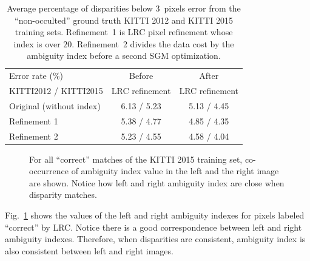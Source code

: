 \documentclass{article}
\begin{document}
\begin{table}
\centering
\begin{tabular}{|l|c|c|}
  \hline
  Error rate (\%) & Before & After \\
  KITTI2012 / KITTI2015      &  LRC refinement & LRC refinement \\
  \hline
  Original (without index) & 6.13 / 5.23 & 5.13 / 4.45 \\
  Refinement 1 & 5.38 / 4.77 & 4.85 / 4.35 \\
  Refinement 2 & 5.23 / 4.55 & 4.58 / 4.04 \\
  \hline
\end{tabular}
\caption{Average percentage of disparities below 3~pixels error from the ``non-occulted'' ground truth KITTI 2012 and KITTI 2015 training sets. Refinement~1 is LRC pixel refinement whose index is over $20$. Refinement~2 divides the data cost by the ambiguity index before a second SGM optimization.}
\label{tab:KITTI}
\end{table}

\begin{figure}[ht]
\begin{center}
\end{center}
\caption{For all ``correct'' matches of the KITTI 2015 training set, co-occurrence of ambiguity index value in the left and the right image are shown. Notice how left and right ambiguity index are close when disparity matches.}
\label{fig:LR_ind}
\end{figure}

Fig.~\ref{fig:LR_ind} shows the values of the left and right ambiguity indexes for pixels labeled ``correct'' by LRC. Notice there is a good correspondence between left and right ambiguity indexes. Therefore, when disparities are consistent, ambiguity index is also consistent between left and right images.
\end{document}
